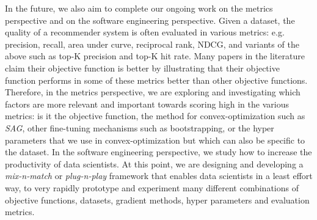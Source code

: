 In the future, we also aim to complete our ongoing work on the metrics perspective and on the software engineering perspective.  
Given a dataset, the quality of a recommender system is often evaluated in various metrics: 
e.g. precision, recall, area under curve, reciprocal rank, NDCG, and variants of the above such as top-K precision and top-K hit rate.
Many papers in the literature claim their objective function is better by illustrating that their objective function performs in some of these metrics better than other objective functions.  
Therefore, in the metrics perspective, we are exploring and investigating which factors are more relevant and important towards scoring high in the various metrics: 
is it the objective function, the method for convex-optimization such as \emph{SAG}, other fine-tuning mechanisms such as bootstrapping, 
or the hyper parameters that we use in convex-optimization but which can also be specific to the dataset.  
In the software engineering perspective, we study how to increase the productivity of data scientists.  
At this point, we are designing and developing a \emph{mix-n-match} or \emph{plug-n-play} framework that enables data scientists in a least effort way, 
to very rapidly prototype and experiment many different combinations of objective functions, datasets, gradient methods, hyper parameters and evaluation metrics.  
